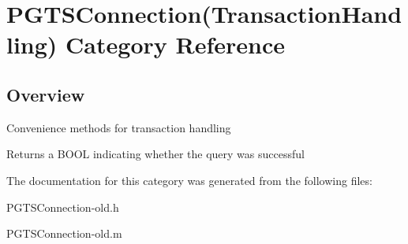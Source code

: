 \hypertarget{category_p_g_t_s_connection_07_transaction_handling_08}{}\section{P\+G\+T\+S\+Connection(Transaction\+Handling) Category Reference}
\label{category_p_g_t_s_connection_07_transaction_handling_08}


\subsection{Overview}
Convenience methods for transaction handling \begin{DoxyReturn}{Returns}
a B\+O\+O\+L indicating whether the query was successful 
\end{DoxyReturn}


The documentation for this category was generated from the following files\+:\begin{DoxyCompactItemize}
\item 
P\+G\+T\+S\+Connection-\/old.\+h\item 
P\+G\+T\+S\+Connection-\/old.\+m\end{DoxyCompactItemize}
